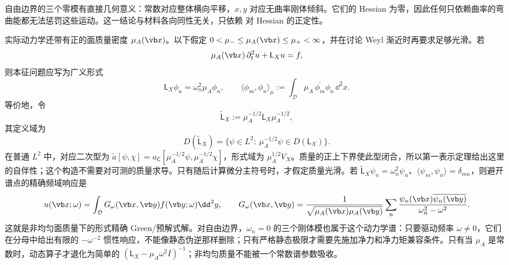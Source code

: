 自由边界的三个零模有直接几何意义：常数对应整体横向平移，\(x,y\) 对应无曲率刚体倾斜。它们的 Hessian 为零，因此任何只依赖曲率的弯曲能都无法惩罚这些运动。这一结论与材料各向同性无关，只依赖 对 Hessian 的正定性。

实际动力学还带有正的面质量密度 \(\mu_A(\vb x)\)。以下假定 \(0<\mu_-\le\mu_A(\vb x)\le\mu_+<\infty\)，并在讨论 Weyl 渐近时再要求足够光滑。若
\begin{equation}
 \mu_A(\vb x)\,\partial_t^2u+\mathsf L_Xu=f,
 \label{eq:phys-cont-weighted-dynamics}
\end{equation}
则本征问题应写为广义形式
\[
 \mathsf L_X\phi_n=\omega_n^2\mu_A\phi_n,
 \qquad
 \langle\phi_m,\phi_n\rangle_\mu
 :=\int_\mathcal D\mu_A\,\overline{\phi_m}\phi_n\,\dd^2x.
\]
等价地，令
\[
 \widetilde{\mathsf L}_X:=\mu_A^{-1/2}\mathsf L_X\mu_A^{-1/2},
\]
其定义域为
\[
 D(\widetilde{\mathsf L}_X)
 =\{\psi\in L^2:\ \mu_A^{-1/2}\psi\in D(\mathsf L_X)\}.
\]
在普通 $L^2$ 中，对应二次型为
$\widetilde a[\psi,\chi]=a_{\mathsf C}[\mu_A^{-1/2}\psi,\mu_A^{-1/2}\chi]$，形式域为 $\mu_A^{1/2}V_X$。质量的正上下界使此型闭合，所以第一表示定理给出这里的自伴性；这个构造不需要对可测的质量求导。只有随后计算微分主符号时，才假定质量光滑。若 \(\widetilde{\mathsf L}_X\psi_n=\omega_n^2\psi_n\)、\(\langle\psi_m,\psi_n\rangle=\delta_{mn}\)，则避开谱点的精确频域响应是
\begin{equation}
 u(\vb x;\omega)
 =\int_\mathcal D G_\omega(\vb x,\vb y)f(\vb y;\omega)\dd^2y,
 \qquad
 G_\omega(\vb x,\vb y)
 =\frac{1}{\sqrt{\mu_A(\vb x)\mu_A(\vb y)}}
 \sum_n\frac{\psi_n(\vb x)\overline{\psi_n(\vb y)}}{\omega_n^2-\omega^2}.
 \label{eq:phys-cont-weighted-dynamic-green}
\end{equation}
这就是非均匀面质量下的形式精确 Green/预解式解。对自由边界，\(\omega_n=0\) 的三个刚体模也属于这个动力学谱：只要驱动频率 \(\omega\neq0\)，它们在分母中给出有限的 \(-\omega^{-2}\) 惯性响应，不能像静态伪逆那样删除；只有严格静态极限才需要先施加净力和净力矩兼容条件。只有当 \(\mu_A\) 是常数时，动态算子才退化为简单的 \((\mathsf L_X-\mu_A\omega^2I)^{-1}\)；非均匀质量不能被一个常数谱参数吸收。


